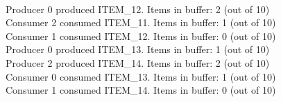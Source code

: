 \\Producer 0 produced ITEM\_12. Items in buffer: 2 (out of 10)
\\Consumer 2 consumed ITEM\_11. Items in buffer: 1 (out of 10)
\\Consumer 1 consumed ITEM\_12. Items in buffer: 0 (out of 10)
\\Producer 0 produced ITEM\_13. Items in buffer: 1 (out of 10)
\\Producer 2 produced ITEM\_14. Items in buffer: 2 (out of 10)
\\Consumer 0 consumed ITEM\_13. Items in buffer: 1 (out of 10)
\\Consumer 1 consumed ITEM\_14. Items in buffer: 0 (out of 10)